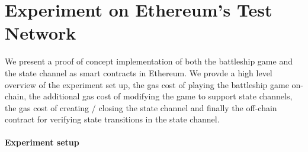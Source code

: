 \documentclass{llncs}
\begin{document}
\section{Experiment on Ethereum's Test Network}

We present a proof of concept implementation of both the battleship game and the state channel as smart contracts in Ethereum. 
We provde a high level overview of the experiment set up, the gas cost of playing the battleship game on-chain, the additional gas cost of modifying the game to support state channels, the gas cost of creating / closing the state channel and finally the off-chain contract for verifying state transitions in the state channel. 

\paragraph{Experiment setup} 
\end{document}
